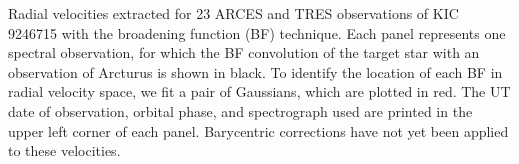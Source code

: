\label{fig:bffig} Radial velocities extracted for 23 ARCES and TRES observations of KIC 9246715 with the broadening function (BF) technique. Each panel represents one spectral observation, for which the BF convolution of the target star with an observation of Arcturus is shown in black. To identify the location of each BF in radial velocity space, we fit a pair of Gaussians, which are plotted in red. The UT date of observation, orbital phase, and spectrograph used are printed in the upper left corner of each panel. Barycentric corrections have not yet been applied to these velocities.